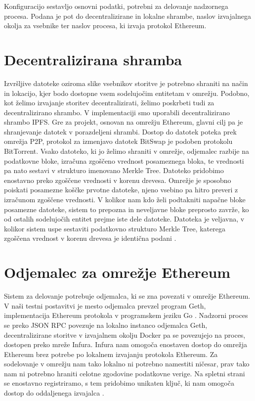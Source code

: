 \documentclass[a4paper, 12pt]{book}
\begin{document}
Konfiguracijo sestavljo osnovni podatki, potrebni za delovanje nadzornega procesa.
Podana je pot do decentralizirane in lokalne shrambe, naslov izvajalnega okolja za vsebnike ter naslov procesa, ki izvaja protokol Ethereum.

\section{Decentralizirana shramba}
Izvršljive datoteke oziroma slike vsebnikov storitve je potrebno shraniti na način in lokacijo, kjer bodo dostopne vsem sodelujočim entitetam v omrežju.
Podobno, kot želimo izvajanje storitev decentralizirati, želimo poskrbeti tudi za decentralizirano shrambo.
V implementaciji smo uporabili decentralizirano shrambo IPFS.
Gre za projekt, osnovan na omrežju Ethereum, glavni cilj pa je shranjevanje datotek v porazdeljeni shrambi.
Dostop do datotek poteka prek omrežja P2P, protokol za izmenjavo datotek BitSwap je podoben protokolu BitTorrent.
Vsako datoteko, ki jo želimo shraniti v omrežje, odjemalec razbije na podatkovne bloke, izračuna zgoščeno vrednost posameznega bloka, te vrednosti pa nato sestavi v strukturo imenovano Merkle Tree.
Datoteko pridobimo enostavno preko zgoščene vrednosti v korenu drevesa.
Omrežje je sposobno poiskati posamezne koščke prvotne datoteke, njeno vsebino pa hitro preveri z izračunom zgoščene vrednosti. 
V kolikor nam kdo želi podtakniti napačne bloke posamezne datoteke, sistem to prepozna in neveljavne bloke preprosto zavrže, ko od ostalih sodelujočih entitet prejme iste dele datoteke. Datoteka je veljavna, v kolikor sistem uspe sestaviti podatkovno strukturo Merkle Tree, katerega zgoščena vrednost v korenu drevesa je identična podani \cite{Ipfs}.

\section{Odjemalec za omrežje Ethereum}
Sistem za delovanje potrebuje odjemalca, ki se zna povezati v omrežje Ethereum.
V naši testni postavitvi je mesto odjemalca prevzel program Geth, implementacija Ethereum protokola v programskem jeziku Go \cite{Geth}.
Nadzorni proces se preko JSON RPC povezuje na lokalno instanco odjemalca Geth, decentralizirane storitve v izvajalnem okolju Docker pa se 
povezujejo na proces, dostopen preko mreže Infura.
Infura nam omogoča enostaven dostop do omrežja Ethereum brez potrebe po lokalnem izvajanju protokola Ethereum.
Za sodelovanje v omrežju nam tako lokalno ni potrebno namestiti ničesar, prav tako nam ni potrebno hraniti
celotne zgodovine podatkovne verige. 
Na spletni strani se enostavno registriramo, s tem pridobimo unikaten ključ, ki nam omogoča dostop do oddaljenega izvajalca \cite{Infura}.
\end{document}
